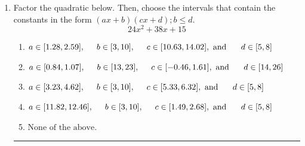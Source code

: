 \documentclass[14pt]{extbook}
\newcommand{\litem}[1]{\item#1\hspace*{-1cm}\rule{\textwidth}{0.4pt}}
\begin{document}
\begin{enumerate}
{\begin{enumerate}[label=\Alph*.]
\end{enumerate} }
\litem{
Factor the quadratic below. Then, choose the intervals that contain the constants in the form $(ax+b)(cx+d); b \leq d.$\[ 24x^{2} +38 x + 15 \]\begin{enumerate}[label=\Alph*.]
\item \( a \in [1.28, 2.59], \hspace*{5mm} b \in [3, 10], \hspace*{5mm} c \in [10.63, 14.02], \text{ and } \hspace*{5mm} d \in [5, 8] \)
\item \( a \in [0.84, 1.07], \hspace*{5mm} b \in [13, 23], \hspace*{5mm} c \in [-0.46, 1.61], \text{ and } \hspace*{5mm} d \in [14, 26] \)
\item \( a \in [3.23, 4.62], \hspace*{5mm} b \in [3, 10], \hspace*{5mm} c \in [5.33, 6.32], \text{ and } \hspace*{5mm} d \in [5, 8] \)
\item \( a \in [11.82, 12.46], \hspace*{5mm} b \in [3, 10], \hspace*{5mm} c \in [1.49, 2.68], \text{ and } \hspace*{5mm} d \in [5, 8] \)
\item \( \text{None of the above.} \)


\end{enumerate}}
\end{enumerate}
\end{document}
